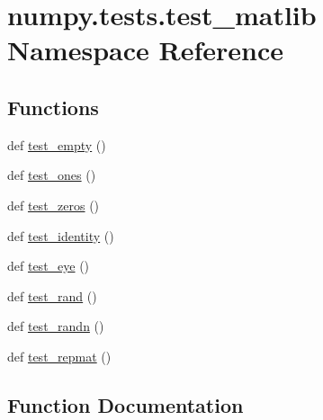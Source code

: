 \hypertarget{namespacenumpy_1_1tests_1_1test__matlib}{}\section{numpy.\+tests.\+test\+\_\+matlib Namespace Reference}
\label{namespacenumpy_1_1tests_1_1test__matlib}
\subsection*{Functions}
\begin{DoxyCompactItemize}
\item 
def \hyperlink{namespacenumpy_1_1tests_1_1test__matlib_abe1225c5bc83ebc66f35b60ce3bd02bc}{test\+\_\+empty} ()
\item 
def \hyperlink{namespacenumpy_1_1tests_1_1test__matlib_a8a9679513cfd2980be109bf1ba3a1274}{test\+\_\+ones} ()
\item 
def \hyperlink{namespacenumpy_1_1tests_1_1test__matlib_a0a5635dc75dd8cee207756dde501c58c}{test\+\_\+zeros} ()
\item 
def \hyperlink{namespacenumpy_1_1tests_1_1test__matlib_adab21fd84dba9691e863f04d3875fc7e}{test\+\_\+identity} ()
\item 
def \hyperlink{namespacenumpy_1_1tests_1_1test__matlib_aa9a5125bb3174cf581a18fd1c75bcb91}{test\+\_\+eye} ()
\item 
def \hyperlink{namespacenumpy_1_1tests_1_1test__matlib_aa0aaaae82ff85027b7e1c8a1a84484ea}{test\+\_\+rand} ()
\item 
def \hyperlink{namespacenumpy_1_1tests_1_1test__matlib_a513a9460362ad0d56d73500845c3dadf}{test\+\_\+randn} ()
\item 
def \hyperlink{namespacenumpy_1_1tests_1_1test__matlib_a4da391646c9e684795ae874bd5c89c66}{test\+\_\+repmat} ()
\end{DoxyCompactItemize}


\subsection{Function Documentation}
\mbox{\label{namespacenumpy_1_1tests_1_1test__matlib_abe1225c5bc83ebc66f35b60ce3bd02bc}} 
